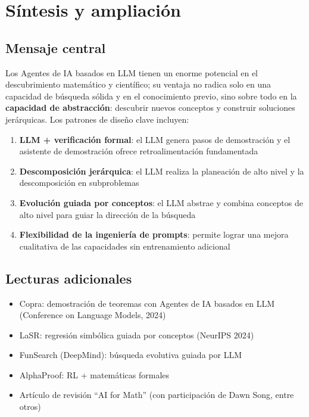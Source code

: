 \documentclass[a4paper]{article}
\begin{document}
\section{Síntesis y ampliación}

\subsection{Mensaje central}

Los Agentes de IA basados en LLM tienen un enorme potencial en el descubrimiento matemático y científico; su ventaja no radica solo en una capacidad de búsqueda sólida y en el conocimiento previo, sino sobre todo en la \textbf{capacidad de abstracción}: descubrir nuevos conceptos y construir soluciones jerárquicas. Los patrones de diseño clave incluyen:

\begin{enumerate}
    \item \textbf{LLM + verificación formal}: el LLM genera pasos de demostración y el asistente de demostración ofrece retroalimentación fundamentada
    \item \textbf{Descomposición jerárquica}: el LLM realiza la planeación de alto nivel y la descomposición en subproblemas
    \item \textbf{Evolución guiada por conceptos}: el LLM abstrae y combina conceptos de alto nivel para guiar la dirección de la búsqueda
    \item \textbf{Flexibilidad de la ingeniería de prompts}: permite lograr una mejora cualitativa de las capacidades sin entrenamiento adicional
\end{enumerate}

\subsection{Lecturas adicionales}
\begin{itemize}
    \item Copra: demostración de teoremas con Agentes de IA basados en LLM (Conference on Language Models, 2024)
    \item LaSR: regresión simbólica guiada por conceptos (NeurIPS 2024)
    \item FunSearch (DeepMind): búsqueda evolutiva guiada por LLM
    \item AlphaProof: RL + matemáticas formales
    \item Artículo de revisión ``AI for Math'' (con participación de Dawn Song, entre otros)
\end{itemize}
\end{document}
